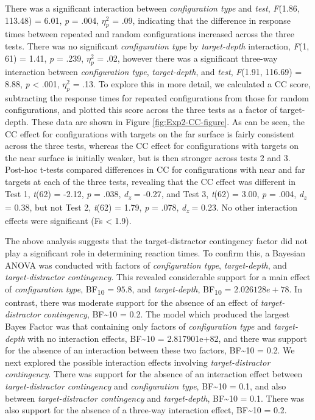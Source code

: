 \documentclass[
  english,
  man,floatsintext]{apa7}
\begin{document}
There was a significant interaction between \emph{configuration type} and \emph{test}, \emph{F}(1.86, 113.48) = 6.01, \emph{p} = .004, \(\eta^2_p\) = .09, indicating that the difference in response times between repeated and random configurations increased across the three tests. There was no significant \emph{configuration type} by \emph{target-depth} interaction, \emph{F}(1, 61) = 1.41, \emph{p} = .239, \(\eta^2_p\) = .02, however there was a significant three-way interaction between \emph{configuration type}, \emph{target-depth}, and \emph{test}, \emph{F}(1.91, 116.69) = 8.88, \emph{p} \textless{} .001, \(\eta^2_p\) = .13. To explore this in more detail, we calculated a CC score, subtracting the response times for repeated configurations from those for random configurations, and plotted this score across the three tests as a factor of target-depth. These data are shown in Figure \ref{fig:Exp2-CC-figure}. As can be seen, the CC effect for configurations with targets on the far surface is fairly consistent across the three tests, whereas the CC effect for configurations with targets on the near surface is initially weaker, but is then stronger across tests 2 and 3. Post-hoc t-tests compared differences in CC for configurations with near and far targets at each of the three tests, revealing that the CC effect was different in Test 1, \emph{t}(62) = -2.12, \emph{p} = .038, \emph{d\textsubscript{z}} = -0.27, and Test 3, \emph{t}(62) = 3.00, \emph{p} = .004, \emph{d\textsubscript{z}} = 0.38, but not Test 2, \emph{t}(62) = 1.79, \emph{p} = .078, \emph{d\textsubscript{z}} = 0.23. No other interaction effects were significant (Fs \textless{} 1.9).

The above analysis suggests that the target-distractor contingency factor did not play a significant role in determining reaction times. To confirm this, a Bayesian ANOVA was conducted with factors of \emph{configuration type}, \emph{target-depth}, and \emph{target-distractor contingency}. This revealed considerable support for a main effect of \emph{configuration type}, BF\textsubscript{10} = \(95.8\), and \emph{target-depth}, BF\textsubscript{10} = \(2.026128e+78\). In contrast, there was moderate support for the absence of an effect of \emph{target-distractor contingency}, BF\textasciitilde10 = 0.2. The model which produced the largest Bayes Factor was that containing only factors of \emph{configuration type} and \emph{target-depth} with no interaction effects, BF\textasciitilde10 = 2.817901e+82, and there was support for the absence of an interaction between these two factors, BF\textasciitilde10 = 0.2. We next explored the possible interaction effects involving \emph{target-distractor contingency}. There was support for the absence of an interaction effect between \emph{target-distractor contingency} and \emph{configuration type}, BF\textasciitilde10 = 0.1, and also between \emph{target-distractor contingency} and \emph{target-depth}, BF\textasciitilde10 = 0.1. There was also support for the absence of a three-way interaction effect, BF\textasciitilde10 = 0.2.
\end{document}
